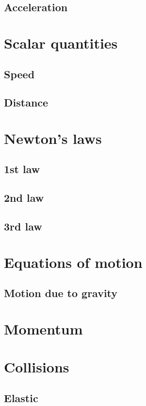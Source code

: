 \documentclass{book}
\begin{document}
\subsection{Acceleration}

\section{Scalar quantities}
\subsection{Speed}

\subsection{Distance}

\section{Newton's laws}
\subsection{1st law}

\subsection{2nd law}

\subsection{3rd law}

\section{Equations of motion}

\subsection{Motion due to gravity}

\section{Momentum}

\section{Collisions}
\subsection{Elastic}
\end{document}
